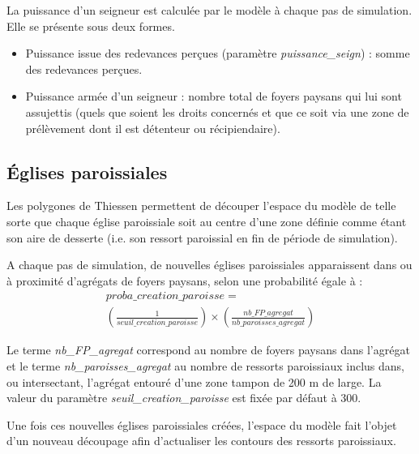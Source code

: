 \documentclass[a4paper,11pt]{article}
\begin{document}
{La puissance d'un seigneur est calculée par le modèle à chaque pas de simulation. Elle se présente sous deux formes. 
\begin{itemize}
\item Puissance issue des redevances perçues (paramètre \textit{puissance\_seign}) : somme des redevances perçues.
\item Puissance armée d'un seigneur : nombre total de foyers paysans qui lui sont assujettis (quels que soient les droits concernés et que ce soit via une zone de prélèvement dont il est détenteur ou récipiendaire).
\end{itemize}


\subsection{Églises paroissiales}

Les polygones de Thiessen permettent de découper l'espace du modèle de telle sorte que chaque église paroissiale soit au centre d'une zone définie comme étant son aire de desserte (i.e. son ressort paroissial en fin de période de simulation). 

A chaque pas de simulation, de nouvelles églises paroissiales apparaissent dans ou à proximité d'agrégats de foyers paysans, selon une probabilité égale à :
\begin{equation}
\begin{gathered}
proba\_creation\_paroisse =\\
( \frac{1}{seuil\_creation\_paroisse}) \times ( \frac{nb\_FP\_agregat}{nb\_paroisses\_agregat} )
\end{gathered}
\end{equation}

Le terme \textit{nb\_FP\_agregat} correspond au nombre de foyers paysans dans l'agrégat et le terme \textit{nb\_paroisses\_agregat} au nombre de ressorts paroissiaux inclus dans, ou intersectant, l'agrégat entouré d'une zone tampon de 200 m de large. La valeur du paramètre \textit{seuil\_creation\_paroisse} est fixée par défaut à 300.

Une fois ces nouvelles églises paroissiales créées, l'espace du modèle fait l'objet d'un nouveau découpage afin d'actualiser les contours des ressorts paroissiaux.

}
\end{document}
